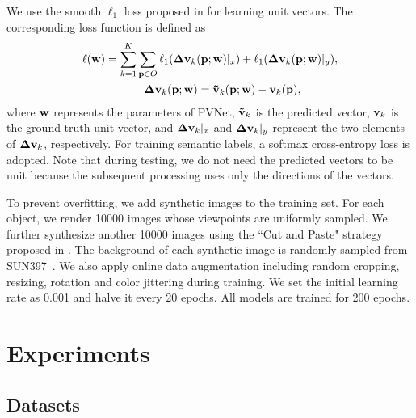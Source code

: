 \documentclass[10pt,twocolumn,letterpaper]{article}
\begin{document}

We use the smooth $\ell_1$ loss proposed in \cite{girshick2015fast} for learning unit vectors. The corresponding loss function is defined as
\begin{align}
    \ell({\bf w})=\sum\limits_{k=1}^K &\sum\limits_{{\bf p}\in O}^{} \ell_1({\bf \Delta v}_k({\bf p};{\bf w})|_x) + \ell_1({\bf \Delta v}_k({\bf p};{\bf w})|_y), \nonumber
    \\
    &~~{\bf \Delta v}_k({\bf p};{\bf w})={\bf \tilde{v}}_k({\bf p};{\bf w})-{\bf v}_k({\bf p}),
\end{align}
where $\bf w$ represents the parameters of PVNet, ${\bf \tilde{v}}_k$ is the predicted vector, ${\bf v}_k$ is the ground truth unit vector, and ${\bf \Delta v}_k|_x$ and ${\bf \Delta v}_k|_y$ represent the two elements of ${\bf \Delta v}_k$, respectively. For training semantic labels, a softmax cross-entropy loss is adopted. Note that during testing, we do not need the predicted vectors to be unit because the subsequent processing uses only the directions of the vectors.

To prevent overfitting, we add synthetic images to the training set. For each object, we render 10000 images whose viewpoints are uniformly sampled. We further synthesize another 10000 images using the ``Cut and Paste" strategy proposed in \cite{dwibedi2017cut}. The background of each synthetic image is randomly sampled from SUN397~\cite{xiao2010sun}. We also apply online data augmentation including random cropping, resizing, rotation and color jittering during training. We set the initial learning rate as 0.001 and halve it every 20 epochs. All models are trained for 200 epochs.

\section{Experiments}\subsection{Datasets}%
\end{document}
